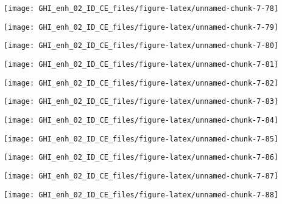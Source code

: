 \documentclass[
  10pt,
  a4paper,oneside]{article}
\begin{document}
\begin{center}\texttt{[image: GHI\_enh\_02\_ID\_CE\_files/figure-latex/unnamed-chunk-7-78]} \end{center}

\begin{center}\texttt{[image: GHI\_enh\_02\_ID\_CE\_files/figure-latex/unnamed-chunk-7-79]} \end{center}

\begin{center}\texttt{[image: GHI\_enh\_02\_ID\_CE\_files/figure-latex/unnamed-chunk-7-80]} \end{center}

\begin{center}\texttt{[image: GHI\_enh\_02\_ID\_CE\_files/figure-latex/unnamed-chunk-7-81]} \end{center}

\begin{center}\texttt{[image: GHI\_enh\_02\_ID\_CE\_files/figure-latex/unnamed-chunk-7-82]} \end{center}

\begin{center}\texttt{[image: GHI\_enh\_02\_ID\_CE\_files/figure-latex/unnamed-chunk-7-83]} \end{center}

\begin{center}\texttt{[image: GHI\_enh\_02\_ID\_CE\_files/figure-latex/unnamed-chunk-7-84]} \end{center}

\begin{center}\texttt{[image: GHI\_enh\_02\_ID\_CE\_files/figure-latex/unnamed-chunk-7-85]} \end{center}

\begin{center}\texttt{[image: GHI\_enh\_02\_ID\_CE\_files/figure-latex/unnamed-chunk-7-86]} \end{center}

\begin{center}\texttt{[image: GHI\_enh\_02\_ID\_CE\_files/figure-latex/unnamed-chunk-7-87]} \end{center}

\begin{center}\texttt{[image: GHI\_enh\_02\_ID\_CE\_files/figure-latex/unnamed-chunk-7-88]} \end{center}
\end{document}

